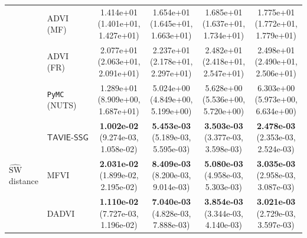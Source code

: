 \documentclass[12pt]{article}
\numberwithin{equation}{section}
\newcommand{\tssg}{\mathsf{TAVIE}\text{-}\mathsf{SSG}}
\begin{document}
{\begin{longtable}{llcccc}
& ADVI (MF)
& \makecell[c]{1.414e+01\\(1.401e+01, 1.427e+01)}
& \makecell[c]{1.654e+01\\(1.645e+01, 1.663e+01)}
& \makecell[c]{1.685e+01\\(1.637e+01, 1.734e+01)}
& \makecell[c]{1.775e+01\\(1.772e+01, 1.779e+01)} \\

& ADVI (FR)
& \makecell[c]{2.077e+01\\(2.063e+01, 2.091e+01)}
& \makecell[c]{2.237e+01\\(2.178e+01, 2.297e+01)}
& \makecell[c]{2.482e+01\\(2.418e+01, 2.547e+01)}
& \makecell[c]{2.498e+01\\(2.490e+01, 2.506e+01)} \\

& \texttt{PyMC} (NUTS)
& \makecell[c]{1.289e+01\\(8.909e+00, 1.687e+01)}
& \makecell[c]{5.024e+00\\(4.849e+00, 5.199e+00)}
& \makecell[c]{5.628e+00\\(5.536e+00, 5.720e+00)}
& \makecell[c]{6.303e+00\\(5.973e+00, 6.634e+00)} \\
\hline

\multirow{5}{*}{$\widehat{\mathrm{SW}}$ distance}
& $\tssg$
& \makecell[c]{\textbf{1.002e-02}\\(9.274e-03, 1.058e-02)}
& \makecell[c]{\textbf{5.453e-03}\\(5.189e-03, 5.595e-03)}
& \makecell[c]{\textbf{3.503e-03}\\(3.377e-03, 3.598e-03)}
& \makecell[c]{\textbf{2.478e-03}\\(2.353e-03, 2.524e-03)} \\

& MFVI
& \makecell[c]{\textbf{2.031e-02}\\(1.899e-02, 2.195e-02)}
& \makecell[c]{\textbf{8.409e-03}\\(8.200e-03, 9.014e-03)}
& \makecell[c]{\textbf{5.080e-03}\\(4.958e-03, 5.303e-03)}
& \makecell[c]{\textbf{3.035e-03}\\(2.958e-03, 3.087e-03)} \\

& DADVI
& \makecell[c]{\textbf{1.110e-02}\\(7.727e-03, 1.196e-02)}
& \makecell[c]{\textbf{7.040e-03}\\(4.828e-03, 7.888e-03)}
& \makecell[c]{\textbf{3.854e-03}\\(3.344e-03, 4.140e-03)}
& \makecell[c]{\textbf{3.021e-03}\\(2.729e-03, 3.597e-03)} \\


\end{longtable}}
\end{document}
